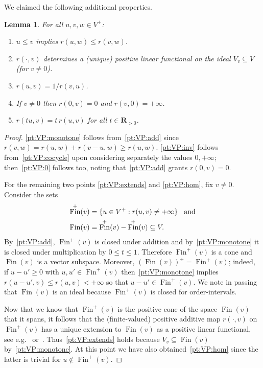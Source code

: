 \documentclass[11pt]{amsart}
\numberwithin{equation}{section}
\newtheorem{lem}[thm]{Lemma}
\theoremstyle{definition}
\theoremstyle{definition}
\newcommand*{\RR}{\mathbf{R}}
\newcommand*{\se}{\subseteq}
\DeclareMathOperator{\finite}{Fin}
\begin{document}
We claimed the following additional properties.

\begin{lem}\label{lem:VP:properties}
For all $u,v,w\in V^+$:
\begin{enumerate}[resume*]
\item $u\leq v$ implies $r(u, w) \leq r(v, w)$.%
\item  $r(\cdot, v)$ determines a (unique) positive linear functional on the ideal $V_v \se V$ (for $v\neq 0$).%
\item $r(u, v) = 1/ r(v, u)$.%
\item If $v\neq 0$ then $r(0, v) = 0$ and $r(v, 0) = +\infty$.%
\item $r(t u,v) = t\, r(u,v)$ for all $t\in \RR_{>0}$.%
\end{enumerate}
\end{lem}

\begin{proof}%
\ref{pt:VP:monotone} follows from~\ref{pt:VP:add} since $r(v, w) = r(u, w) + r(v-u, w) \geq  r(u, w)$. \ref{pt:VP:inv} follows from~\ref{pt:VP:cocycle} upon considering separately the values $0, +\infty$; then~\ref{pt:VP:0} follows too, noting that~\ref{pt:VP:add} grants $r(0, v) = 0$.

For the remaining two points \ref{pt:VP:extends} and \ref{pt:VP:hom}, fix $v\neq 0$. Consider the sets
\begin{align*}
\finite^+(v) &= \{ u\in V^+ : r(u, v) \neq +\infty \}\kern3mm\text{and}\\
\finite(v) &= \finite^+(v) - \finite^+(v) \se V.
\end{align*}
By~\ref{pt:VP:add}, $\finite^+(v)$ is closed under addition and by~\ref{pt:VP:monotone} it is closed under multiplication by $0\leq t \leq 1$. Therefore $\finite^+(v)$ is a cone and $\finite(v)$ is a vector subspace. Moreover, $(\finite(v))^+= \finite^+(v)$; indeed, if $u-u'\geq 0$ with $u, u'\in \finite^+(v)$ then~\ref{pt:VP:monotone} implies $r(u-u', v) \leq r(u,v) < +\infty$ so that $u-u'\in \finite^+(v)$. We note in passing that $\finite(v)$ is an ideal because $\finite^+(v)$ is closed for order-intervals.

Now that we know that $\finite^+(v)$ is the positive cone of the space $\finite(v)$ that it spans, it follows that the (finite-valued) positive additive map $r(\cdot, v)$ on $\finite^+(v)$ has a unique extension to $\finite(v)$ as a positive linear functional, see e.g.~\cite[Lemma~83.1]{ZaanenII} or~\cite[Lemma~1.26]{Aliprantis-Tourky}. Thus~\ref{pt:VP:extends} holds because $V_v \se \finite(v)$ by~\ref{pt:VP:monotone}. At this point we have also obtained~\ref{pt:VP:hom} since the latter is trivial for $u\notin \finite^+(v)$.
\end{proof}
\end{document}
